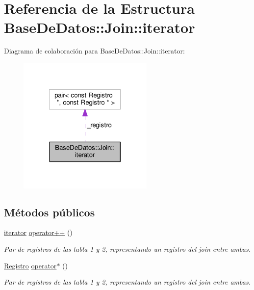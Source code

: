 \hypertarget{structBaseDeDatos_1_1Join_1_1iterator}{\section{Referencia de la Estructura Base\-De\-Datos\-:\-:Join\-:\-:iterator}
\label{structBaseDeDatos_1_1Join_1_1iterator}
}


Diagrama de colaboración para Base\-De\-Datos\-:\-:Join\-:\-:iterator\-:
\nopagebreak
\begin{figure}[H]
\begin{center}
\leavevmode
\includegraphics[width=188pt]{structBaseDeDatos_1_1Join_1_1iterator__coll__graph}
\end{center}
\end{figure}
\subsection*{Métodos públicos}
\begin{DoxyCompactItemize}
\item 
\hypertarget{structBaseDeDatos_1_1Join_1_1iterator_a3ffbdf64b1986e8f3bc745b754c7b538}{\hyperlink{structBaseDeDatos_1_1Join_1_1iterator}{iterator} \hyperlink{structBaseDeDatos_1_1Join_1_1iterator_a3ffbdf64b1986e8f3bc745b754c7b538}{operator++} ()}\label{structBaseDeDatos_1_1Join_1_1iterator_a3ffbdf64b1986e8f3bc745b754c7b538}

\begin{DoxyCompactList}\small\item\em Par de registros de las tabla 1 y 2, representando un registro del join entre ambas. \end{DoxyCompactList}\item 
\hypertarget{structBaseDeDatos_1_1Join_1_1iterator_a5b090095c29aad7e8b7c18d6d5e8b202}{\hyperlink{classRegistro}{Registro} \hyperlink{structBaseDeDatos_1_1Join_1_1iterator_a5b090095c29aad7e8b7c18d6d5e8b202}{operator$\ast$} ()}\label{structBaseDeDatos_1_1Join_1_1iterator_a5b090095c29aad7e8b7c18d6d5e8b202}

\begin{DoxyCompactList}\small\item\em Par de registros de las tabla 1 y 2, representando un registro del join entre ambas. \end{DoxyCompactList}\end{DoxyCompactItemize}
